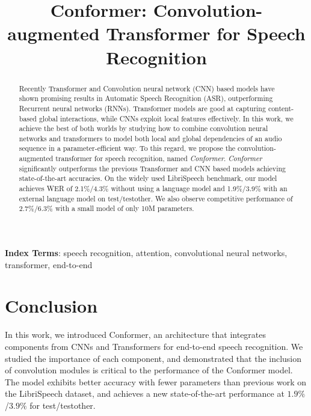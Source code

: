 \documentclass[a4paper]{article}
\title{Conformer: Convolution-augmented Transformer for Speech Recognition}
\begin{document}
\maketitle
% 
\begin{abstract}
Recently Transformer and Convolution neural network (CNN) based models have shown promising results in Automatic Speech Recognition (ASR), outperforming Recurrent neural networks (RNNs). Transformer models are good at capturing content-based global interactions, while CNNs exploit local features effectively.
In this work, we achieve the best of both worlds by studying how to combine convolution neural networks and transformers to model both local and global dependencies of an audio sequence in a parameter-efficient way. To this regard, we propose the convolution-augmented transformer for speech recognition, named \textit{Conformer}. \textit{Conformer} significantly outperforms the previous Transformer and CNN based models achieving state-of-the-art accuracies. On the widely used LibriSpeech benchmark, our model achieves WER of 2.1\%/4.3\% without using a language model and 1.9\%/3.9\% with an external language model on test/testother. We also observe competitive performance of 2.7\%/6.3\% with a small model of only 10M parameters.

\end{abstract}
\noindent\textbf{Index Terms}: speech recognition, attention, convolutional neural networks, transformer, end-to-end





\section{Conclusion}
In this work,
we introduced Conformer, an architecture that integrates components from CNNs and Transformers for end-to-end speech recognition. We studied the importance of each component, and demonstrated that the inclusion of convolution modules is critical to the performance of the Conformer model.
The model exhibits better accuracy with fewer parameters than previous work on the LibriSpeech dataset, and achieves a new state-of-the-art performance at $1.9\%$/$3.9\%$ for test/testother.





\end{document}

